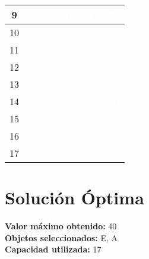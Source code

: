 \documentclass{article}
\begin{document}
\begin{center}
\begin{tabular}{|c|c|c|c|c|c|}
9 & \cellcolor{rojo}\textcolor{white}{0} & \cellcolor{verde}\textcolor{white}{15} & \cellcolor{rojo}\textcolor{white}{15} & \cellcolor{rojo}\textcolor{white}{15} & \cellcolor{verde}\textcolor{white}{25} \\ \hline
10 & \cellcolor{rojo}\textcolor{white}{0} & \cellcolor{verde}\textcolor{white}{15} & \cellcolor{rojo}\textcolor{white}{15} & \cellcolor{verde}\textcolor{white}{18} & \cellcolor{verde}\textcolor{white}{25} \\ \hline
11 & \cellcolor{rojo}\textcolor{white}{0} & \cellcolor{verde}\textcolor{white}{15} & \cellcolor{rojo}\textcolor{white}{15} & \cellcolor{verde}\textcolor{white}{18} & \cellcolor{verde}\textcolor{white}{25} \\ \hline
12 & \cellcolor{rojo}\textcolor{white}{0} & \cellcolor{verde}\textcolor{white}{15} & \cellcolor{rojo}\textcolor{white}{15} & \cellcolor{verde}\textcolor{white}{18} & \cellcolor{verde}\textcolor{white}{25} \\ \hline
13 & \cellcolor{verde}\textcolor{white}{30} & \cellcolor{rojo}\textcolor{white}{30} & \cellcolor{rojo}\textcolor{white}{30} & \cellcolor{rojo}\textcolor{white}{30} & \cellcolor{rojo}\textcolor{white}{30} \\ \hline
14 & \cellcolor{verde}\textcolor{white}{30} & \cellcolor{rojo}\textcolor{white}{30} & \cellcolor{rojo}\textcolor{white}{30} & \cellcolor{rojo}\textcolor{white}{30} & \cellcolor{rojo}\textcolor{white}{30} \\ \hline
15 & \cellcolor{verde}\textcolor{white}{30} & \cellcolor{rojo}\textcolor{white}{30} & \cellcolor{rojo}\textcolor{white}{30} & \cellcolor{verde}\textcolor{white}{33} & \cellcolor{rojo}\textcolor{white}{33} \\ \hline
16 & \cellcolor{verde}\textcolor{white}{30} & \cellcolor{rojo}\textcolor{white}{30} & \cellcolor{rojo}\textcolor{white}{30} & \cellcolor{verde}\textcolor{white}{33} & \cellcolor{rojo}\textcolor{white}{33} \\ \hline
17 & \cellcolor{verde}\textcolor{white}{30} & \cellcolor{rojo}\textcolor{white}{30} & \cellcolor{rojo}\textcolor{white}{30} & \cellcolor{verde}\textcolor{white}{33} & \cellcolor{verde}\textcolor{white}{40} \\ \hline
\end{tabular}
\end{center}
\normalsize

\section*{Solución Óptima}
\textbf{Valor máximo obtenido:} 40\\
\textbf{Objetos seleccionados:} E, A\\
\textbf{Capacidad utilizada:} 17\\
\end{document}
